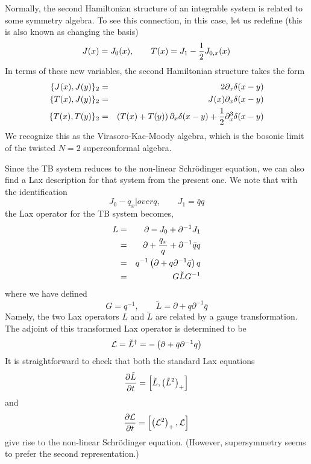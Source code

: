 \documentclass[a4paper,11pt]{article}
\begin{document}
Normally, the second Hamiltonian structure of an integrable system is
related to some symmetry algebra. To see this connection, in this
case, let us redefine (this is also known as changing the basis)
\begin{equation}
J(x) = J_{0}(x),\qquad T(x) = J_{1} - {1\over 2} J_{0,x}(x)
\end{equation}
In terms of these new variables, the second Hamiltonian structure takes the
form
\begin{eqnarray}
\{J(x),J(y)\}_{2} & = & 2 \partial_{x} \delta (x-y)\nonumber\\
\{T(x),J(y)\}_{2} & = & J(x) \partial_{x} \delta (x-y)\nonumber\\
\{T(x),T(y)\}_{2} & = & \left(T(x) + T(y)\right)\partial_{x} \delta
(x-y) + {1\over 2} \partial_{x}^{3} \delta (x-y)
\end{eqnarray}
We recognize this as the Virasoro-Kac-Moody algebra, which is the
bosonic limit of the twisted $N=2$ superconformal algebra.
\vfill\eject


Since the TB system reduces to the non-linear Schr\"{o}dinger
equation, we can also find a Lax description for that system from the
present one. We note that with the identification
\begin{equation}
J_{0} - {q_{x}|over q},\qquad J_{1} = \bar{q} q
\end{equation}
the Lax operator for the TB system becomes,
\begin{eqnarray}
L & = & \partial - J_{0} + \partial^{-1} J_{1}\nonumber\\
 & = & \partial + {q_{x}\over q} + \partial^{-1}\bar{q} q\nonumber\\
 & = & q^{-1} \left(\partial + q \partial^{-1} \bar{q}\right) q\nonumber\\
 & = & G \tilde{L} G^{-1}
\end{eqnarray}
where we have defined
\begin{equation}
G = q^{-1},\qquad \tilde{L} = \partial + q \partial^{-1} \bar{q}
\end{equation}
Namely, the two Lax operators $L$ and $\tilde{L}$ are related by a
gauge transformation. The adjoint of this transformed Lax operator is
determined to be
\begin{equation}
{\cal L} = \tilde{L}^{\dagger} = - \left(\partial + \bar{q}
\partial^{-1} q\right)
\end{equation}
It is straightforward to check that both the standard Lax equations
\begin{equation}
{\partial \tilde{L}\over \partial t} =
\left[\tilde{L},\left(\tilde{L}^{2}\right)_{+}\right]
\end{equation}
and 
\begin{equation}
{\partial {\cal L}\over \partial t} = \left[\left({\cal
L}^{2}\right)_{+},{\cal L}\right]
\end{equation}
give rise to the non-linear Schr\"{o}dinger equation. (However,
supersymmetry seems to prefer the second representation.)
\end{document}
